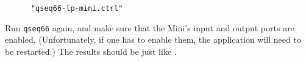    \begin{verbatim}
      "qseq66-lp-mini.ctrl"
   \end{verbatim}

   Run \texttt{qseq66} again, and make sure that the Mini's input and output
   ports are enabled. (Unfortunately, if one has to enable them, the
   application will need to be restarted.)
   The results should be just like
   .

